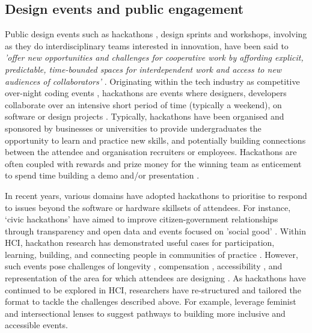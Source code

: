 \subsection{Design events and public engagement}
\label{RW:DesignEvents}
Public design events such as hackathons \citep{olesen_what_2021}, design sprints and workshops, involving as they do interdisciplinary teams interested in innovation, have been said to \textit{’offer new opportunities and challenges for cooperative work by affording explicit, predictable, time-bounded spaces for interdependent work and access to new audiences of collaborators’} \citep{filippova_hacking_2017}. Originating within the tech industry as competitive over-night coding events \citep{jones_theres_2015}, hackathons are events where designers, developers collaborate over an intensive short period of time (typically a weekend), on software or design projects \citep{nandi_hackathons_2016}. Typically, hackathons have been organised and sponsored by businesses or universities to provide undergraduates the opportunity to learn and practice new skills, and potentially building connections between the attendee and organisation recruiters or employees. Hackathons are often coupled with rewards and prize money for the winning team as enticement to spend time building a demo and/or presentation \citep{jones_theres_2015}. 

In recent years, various domains have adopted hackathons to prioritise to respond to issues beyond the software or hardware skillsets of attendees. For instance, ‘civic hackathons’ \citep{johnson_civic_2014} have aimed to improve citizen-government relationships through transparency and open data and events focused on 'social good' \citep{ferrario_software_2014}. Within HCI, hackathon research has demonstrated useful cases for participation, learning, building, and connecting people in communities of practice \citep{falk_olesen_10_2020, birbeck_self_2017, hou_hacking_2017, johnson_civic_2014} . However, such events pose challenges of longevity \citep{birbeck_self_2017}, compensation \citep{endrissat_hackathons_2018}, accessibility \citep{hope_hackathons_2019}, and representation of the area for which attendees are designing \citep{toombs_hackerspace_2017}. As hackathons have continued to be explored in HCI, researchers have re-structured and tailored the format to tackle the challenges described above. For example, \cite{hope_hackathons_2019} leverage feminist and intersectional lenses to suggest pathways to building more inclusive and accessible events. 

